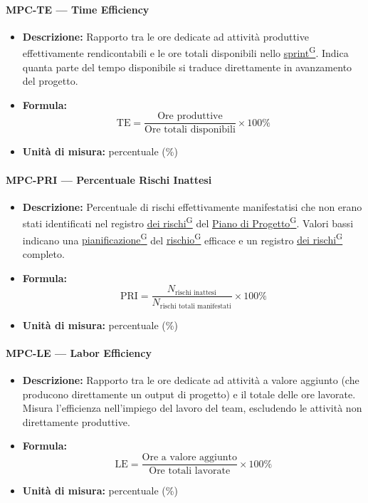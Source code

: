 \documentclass[a4paper,12pt]{article}
\providecommand{\glslink}[2]{\href{https://alittlebyte-19.github.io/Documentazione/glossario.html\#gls-#1}{\underline{#2}\textsuperscript{\scriptsize G}}}
\begin{document}
\paragraph{MPC-TE --- Time Efficiency}
\begin{itemize}
    \item \textbf{Descrizione:} Rapporto tra le ore dedicate ad attività produttive effettivamente rendicontabili e le ore totali disponibili nello \glslink{sprint}{sprint}. Indica quanta parte del tempo disponibile si traduce direttamente in avanzamento del progetto.
    \item \textbf{Formula:}
    $$\text{TE} = \frac{\text{Ore produttive}}{\text{Ore totali disponibili}} \times 100\%$$
    \item \textbf{Unità di misura:} percentuale (\%)
\end{itemize}

\paragraph{MPC-PRI --- Percentuale Rischi Inattesi}
\begin{itemize}
    \item \textbf{Descrizione:} Percentuale di rischi effettivamente manifestatisi che non erano stati identificati nel registro \glslink{mitigazione-dei-rischi}{dei rischi} del \glslink{piano-di-progetto}{Piano di Progetto}. Valori bassi indicano una \glslink{pianificazione}{pianificazione} del \glslink{rischio}{rischio} efficace e un registro \glslink{mitigazione-dei-rischi}{dei rischi} completo.
    \item \textbf{Formula:}
    $$\text{PRI} = \frac{N_{\text{rischi inattesi}}}{N_{\text{rischi totali manifestati}}} \times 100\%$$
    \item \textbf{Unità di misura:} percentuale (\%)
\end{itemize}

\paragraph{MPC-LE --- Labor Efficiency}
\begin{itemize}
    \item \textbf{Descrizione:} Rapporto tra le ore dedicate ad attività a valore aggiunto (che producono direttamente un output di progetto) e il totale delle ore lavorate. Misura l'efficienza nell'impiego del lavoro del team, escludendo le attività non direttamente produttive.
    \item \textbf{Formula:}
    $$\text{LE} = \frac{\text{Ore a valore aggiunto}}{\text{Ore totali lavorate}} \times 100\%$$
    \item \textbf{Unità di misura:} percentuale (\%)
\end{itemize}
\end{document}
